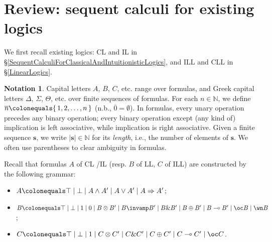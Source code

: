 \documentclass[a4paper]{article}
\theoremstyle{definition}
\newtheorem{notation}[definition]{Notation}
\theoremstyle{theorem}
\theoremstyle{remark}
\begin{document}
\section{Review: sequent calculi for existing logics}
\label{SequentCalculi}
We first recall existing logics: CL and IL in \S\ref{SequentCalculiForClassicalAndIntuitionisticLogics}, and ILL and CLL in \S\ref{LinearLogics}.

\begin{notation}
Capital letters $A$, $B$, $C$, etc. range over formulas, and Greek capital letters $\Delta$, $\Sigma$, $\Theta$, etc. over finite sequences of formulas.
For each $n \in \mathbb{N}$, we define $\overline{n} \colonequals \{ \, 1, 2, \dots, n \, \}$ (n.b., $\overline{0} = \emptyset$).
In formulas, every unary operation precedes any binary operation; every binary operation except (any kind of) implication is left associative, while implication is right associative.
Given a finite sequence $\boldsymbol{s}$, we write $|\boldsymbol{s}| \in \mathbb{N}$ for its \emph{length}, i.e., the number of elements of $\boldsymbol{s}$.
We often use parentheses to clear ambiguity in formulas.
\end{notation}

Recall that formulas $A$ of CL /IL (resp. $B$ of LL, $C$ of ILL) are constructed by the following grammar:
\begin{itemize}

\item $A \colonequals \top \mid \bot \mid A \wedge A' \mid A \vee A' \mid A \Rightarrow A'$;

\item $B \colonequals \top \mid \bot \mid 1 \mid 0 \mid B \otimes B' \mid B \invamp B' \mid B \& B' \mid B \oplus B' \mid B \multimap B' \mid \oc B \mid \wn B$;

\item $C \colonequals \top \mid \bot \mid 1 \mid C \otimes C' \mid C \& C' \mid C \oplus C' \mid C \multimap C' \mid \oc C$.

\end{itemize}
\fi
\end{document}
